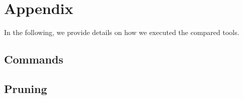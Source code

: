 \chapter{Appendix} \label{ch:appendix}

In the following, we provide details on how we executed the compared tools.

\section{Commands} \label{sec:commands}


\section{Pruning} \label{sec:pruning}


